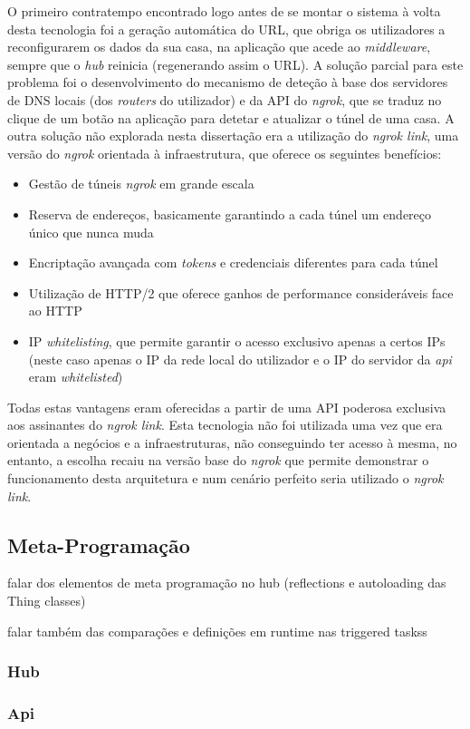 O primeiro contratempo encontrado logo antes de se montar o sistema à volta desta tecnologia foi a geração automática do URL, que obriga os utilizadores a reconfigurarem os dados da sua casa, na aplicação que acede ao \textit{middleware}, sempre que o \textit{hub} reinicia (regenerando assim o URL). A solução parcial para este problema foi o desenvolvimento do mecanismo de deteção à base dos servidores de DNS locais (dos \textit{routers} do utilizador) e da API do \textit{ngrok}, que se traduz no clique de um botão na aplicação para detetar e atualizar o túnel de uma casa. A outra solução não explorada nesta dissertação era a utilização do \textit{ngrok link}, uma versão do \textit{ngrok} orientada à infraestrutura, que oferece os seguintes benefícios:
\begin{itemize}
    \item Gestão de túneis \textit{ngrok} em grande escala
    \item Reserva de endereços, basicamente garantindo a cada túnel um endereço único que nunca muda
    \item Encriptação avançada com \textit{tokens} e credenciais diferentes para cada túnel
    \item Utilização de HTTP/2 que oferece ganhos de performance consideráveis face ao HTTP
    \item IP \textit{whitelisting}, que permite garantir o acesso exclusivo apenas a certos IPs (neste caso apenas o IP da rede local do utilizador e o IP do servidor da \textit{api} eram \textit{whitelisted})
\end{itemize}

Todas estas vantagens eram oferecidas a partir de uma API poderosa exclusiva aos assinantes do \textit{ngrok link}. Esta tecnologia não foi utilizada uma vez que era orientada a negócios e a infraestruturas, não conseguindo ter acesso à mesma, no entanto, a escolha recaiu na versão base do \textit{ngrok} que permite demonstrar o funcionamento desta arquitetura e num cenário perfeito seria utilizado o \textit{ngrok link}.

\subsection{Meta-Programação}

falar dos elementos de meta programação no hub (reflections e autoloading das Thing classes)

falar também das comparações e definições em runtime nas triggered taskss

\subsubsection{Hub}

\subsubsection{Api}